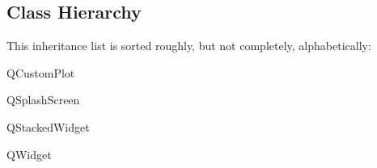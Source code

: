 \subsection{Class Hierarchy}
This inheritance list is sorted roughly, but not completely, alphabetically\+:\begin{DoxyCompactList}
\item {}
\item Q\+Custom\+Plot\begin{DoxyCompactList}
\item {}
\end{DoxyCompactList}
\item Q\+Splash\+Screen\begin{DoxyCompactList}
\item {}
\end{DoxyCompactList}
\item Q\+Stacked\+Widget\begin{DoxyCompactList}
\item {}
\end{DoxyCompactList}
\item Q\+Widget\begin{DoxyCompactList}
\item {}
\item {}
\item {}
\item {}
\end{DoxyCompactList}
\item {}
\begin{DoxyCompactList}
\item {}
\item {}
\item {}
\end{DoxyCompactList}
\end{DoxyCompactList}
